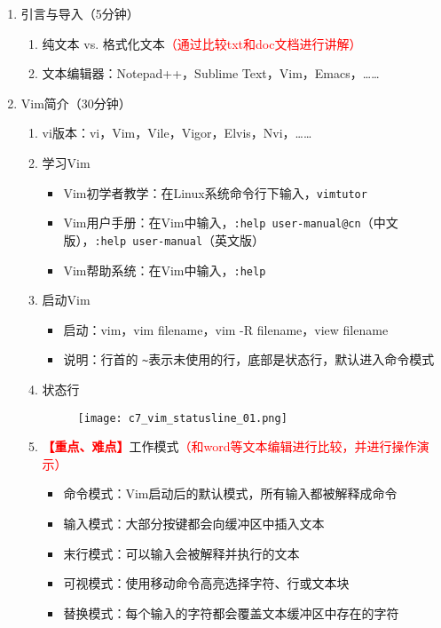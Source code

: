 \documentclass{TIJMUjiaoanLL}
\begin{document}
\firstTail


\newpage
\otherHeader

\begin{enumerate}
  \item 引言与导入（5分钟）
    \begin{enumerate}
      \item 纯文本 vs.  格式化文本\textcolor{red}{（通过比较txt和doc文档进行讲解）}
      \item 文本编辑器：Notepad++，Sublime Text，Vim，Emacs，……
    \end{enumerate}

  \item Vim简介（30分钟）
    \begin{enumerate}
      \item vi版本：vi，Vim，Vile，Vigor，Elvis，Nvi，……
      \item 学习Vim
	\begin{itemize}
          \item Vim初学者教学：在Linux系统命令行下输入，\verb|vimtutor|
          \item Vim用户手册：在Vim中输入，\verb|:help user-manual@cn|（中文版），\verb|:help user-manual|（英文版）
          \item Vim帮助系统：在Vim中输入，\verb|:help|
	\end{itemize}
      \item 启动Vim
	\begin{itemize}
	  \item 启动：vim，vim filename，vim -R filename，view filename
	  \item 说明：行首的 \verb|~|表示未使用的行，底部是状态行，默认进入命令模式
	\end{itemize}
      \item 状态行
    \vspace*{-10pt}
    \begin{figure}[h]
      \centering
      \texttt{[image: c7\_vim\_statusline\_01.png]}
    \end{figure}
    \vspace*{-10pt}
      \item
	\textcolor{red}{\textbf{【重点、难点】}}工作模式\textcolor{red}{（和word等文本编辑进行比较，并进行操作演示）}
	\begin{itemize}
	  \item 命令模式：Vim启动后的默认模式，所有输入都被解释成命令
	  \item 输入模式：大部分按键都会向缓冲区中插入文本
	  \item 末行模式：可以输入会被解释并执行的文本
	  \item 可视模式：使用移动命令高亮选择字符、行或文本块
	  \item 替换模式：每个输入的字符都会覆盖文本缓冲区中存在的字符
	\end{itemize}
    \end{enumerate}


\end{enumerate}
\end{document}
